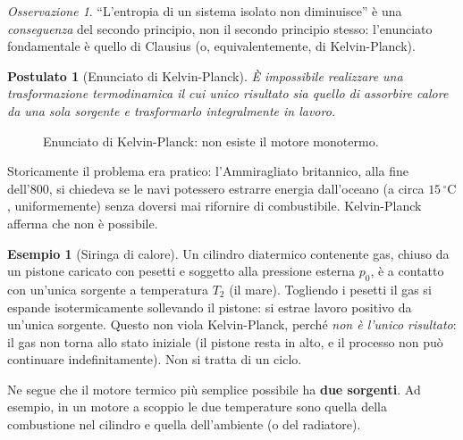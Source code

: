 \documentclass[11pt, a4paper, openright]{book}
\theoremstyle{plain}
\newtheorem{postulato}[teorema]{Postulato}
\theoremstyle{definition}
\newtheorem{esempio}[teorema]{Esempio}
\theoremstyle{remark}
\newtheorem{osservazione}[teorema]{Osservazione}
\begin{document}
\begin{osservazione}
    ``L'entropia di un sistema isolato non diminuisce'' è una \emph{conseguenza} del secondo principio, non il secondo principio stesso: l'enunciato fondamentale è quello di Clausius (o, equivalentemente, di Kelvin-Planck).
\end{osservazione}

\begin{postulato}[Enunciato di Kelvin-Planck]
    È impossibile realizzare una trasformazione termodinamica il cui \emph{unico} risultato sia quello di assorbire calore da una sola sorgente e trasformarlo integralmente in lavoro.
\end{postulato}

\begin{figure}[H]
    \centering
    \caption{Enunciato di Kelvin-Planck: non esiste il motore monotermo.}
\end{figure}

Storicamente il problema era pratico: l'Ammiragliato britannico, alla fine dell'800, si chiedeva se le navi potessero estrarre energia dall'oceano (a circa $15\,^\circ\text{C}$, uniformemente) senza doversi mai rifornire di combustibile. Kelvin-Planck afferma che non è possibile.

\begin{esempio}[Siringa di calore]
    Un cilindro diatermico contenente gas, chiuso da un pistone caricato con pesetti e soggetto alla pressione esterna $p_0$, è a contatto con un'unica sorgente a temperatura $T_2$ (il mare). Togliendo i pesetti il gas si espande isotermicamente sollevando il pistone: si estrae lavoro positivo da un'unica sorgente. Questo non viola Kelvin-Planck, perché \emph{non è l'unico risultato}: il gas non torna allo stato iniziale (il pistone resta in alto, e il processo non può continuare indefinitamente). Non si tratta di un ciclo.
\end{esempio}

Ne segue che il motore termico più semplice possibile ha \textbf{due sorgenti}. Ad esempio, in un motore a scoppio le due temperature sono quella della combustione nel cilindro e quella dell'ambiente (o del radiatore).
\end{document}
